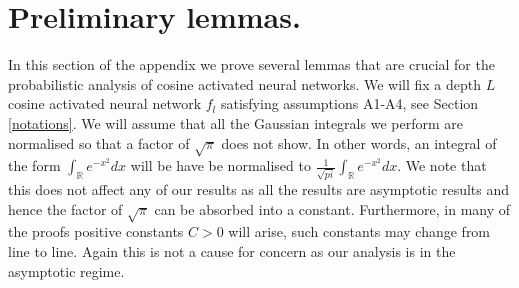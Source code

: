 \documentclass{article}
\theoremstyle{plain}
\theoremstyle{definition}
\theoremstyle{remark}
\newcommand\R{\mathbb{R}}
\begin{document}




\nocite{langley00}





\newpage
\appendix
\onecolumn
\section{Preliminary lemmas.}\label{app_prelims}

In this section of the appendix we prove several lemmas that are crucial for the probabilistic analysis of cosine activated neural networks. We will fix a depth $L$ cosine activated neural network $f_l$ satisfying assumptions A1-A4, 
see Section \ref{notations}. 
We will assume that all the Gaussian integrals we perform are normalised so that a factor of $\sqrt{\pi}$ does not show. In other words, an integral of the form
$\int_{\R}e^{-x^2}dx$ will be have be normalised to 
$\frac{1}{\sqrt{pi}}\int_{\R}e^{-x^2}dx$. We note that this does not affect any of our results as all the results are asymptotic results and hence the factor of $\sqrt{\pi}$
can be absorbed into a constant. Furthermore, in many of the proofs positive constants
$C > 0$ will arise, such constants may change from line to line. Again this is not a cause for concern as our analysis is in the asymptotic regime.
\end{document}
